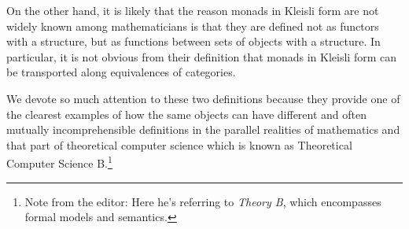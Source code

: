\documentclass[onecolumn,12pt]{amsart}
\numberwithin{proposition}{subsection}
\newcommand{\editorfootnote}[1]{\footnote{Note from the editor: #1}}
\begin{document}
On the other hand, it is likely that the reason monads in Kleisli form are not
widely known among mathematicians is that they are defined not as functors with
a structure, but as functions between sets of objects with a structure. In
particular, it is not obvious from their definition that monads in Kleisli
form can be transported along equivalences of categories.

We devote so much attention to these two definitions because they provide one
of the clearest examples of how the same objects can have different and often
mutually incomprehensible definitions in the parallel realities of mathematics
and that part of theoretical computer science which is known as Theoretical
Computer Science B.\editorfootnote{Here he's referring to {\em Theory B}, which
  encompasses formal models and semantics.}
\end{document}
